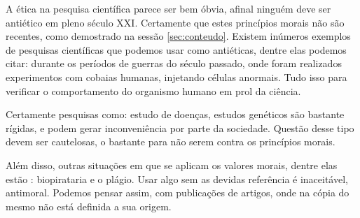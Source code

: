 \documentclass[12pt]{article}
\begin{document}
A ética na pesquisa científica parece ser bem óbvia, afinal ninguém deve ser antiético em pleno século XXI. Certamente que estes princípios morais não são recentes, como demostrado na sessão \ref{sec:conteudo}. Existem inúmeros exemplos de pesquisas científicas que podemos usar como antiéticas, dentre elas podemos citar: durante os períodos de guerras do século passado, onde foram realizados experimentos com cobaias humanas, injetando células anormais. Tudo isso para verificar o comportamento do organismo humano em prol da ciência. 

Certamente pesquisas como: estudo de doenças, estudos genéticos são bastante rígidas, e podem gerar inconveniência por parte da sociedade. Questão desse tipo devem ser cautelosas, o bastante para não serem contra os princípios morais.

Além disso, outras situações em que se aplicam os valores morais, dentre elas estão : biopirataria e o plágio. Usar algo sem as devidas referência é inaceitável, antimoral. Podemos pensar assim, com publicações de artigos, onde na cópia do mesmo não está definida a sua origem.  



\end{document}
